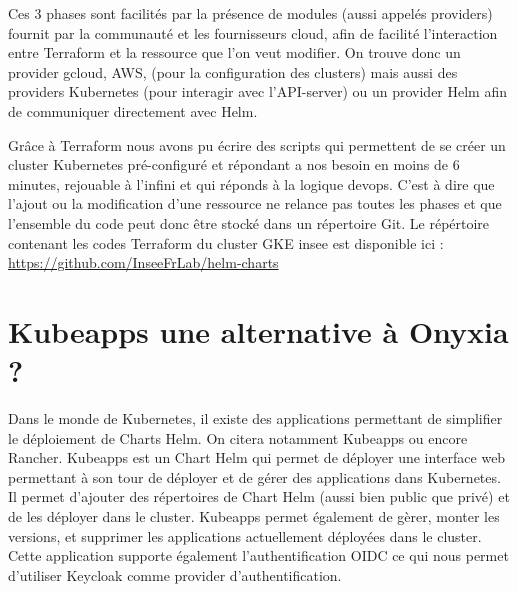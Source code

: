 \documentclass[11pt,fleqn]{book} %
\begin{document}
Ces 3 phases sont facilités par la présence de modules (aussi appelés providers) fournit par la communauté et les fournisseurs cloud, afin de facilité l'interaction entre Terraform et la ressource que l'on veut modifier. On trouve donc un provider gcloud, AWS, (pour la configuration des clusters) mais aussi des providers Kubernetes (pour interagir avec l'API-server) ou un provider Helm afin de communiquer directement avec Helm.\newline

Grâce à Terraform nous avons pu écrire des scripts qui permettent de se créer un cluster Kubernetes pré-configuré et répondant a nos besoin en moins de 6 minutes, rejouable à l'infini et qui réponds à la logique devops. C'est à dire que l'ajout ou la modification d'une ressource ne relance pas toutes les phases et que l'ensemble du code peut donc être stocké dans un répertoire Git. Le répértoire contenant les codes Terraform du cluster GKE insee est disponible ici : \url{https://github.com/InseeFrLab/helm-charts}



\chapter{Kubeapps une alternative à Onyxia ?}
\label{kubeapps}
\vspace{-2cm}
Dans le monde de Kubernetes, il existe des applications permettant de simplifier le déploiement de Charts Helm. On citera notamment Kubeapps ou encore Rancher. Kubeapps est un Chart Helm qui permet de déployer une interface web permettant à son tour de déployer et de gérer des applications dans Kubernetes. Il permet d'ajouter des répertoires de Chart Helm (aussi bien public que privé) et de les déployer dans le cluster. Kubeapps permet également de gèrer, monter les versions, et supprimer les applications actuellement déployées dans le cluster. Cette application supporte également l'authentification OIDC ce qui nous permet d'utiliser Keycloak comme provider d'authentification.
\end{document}
